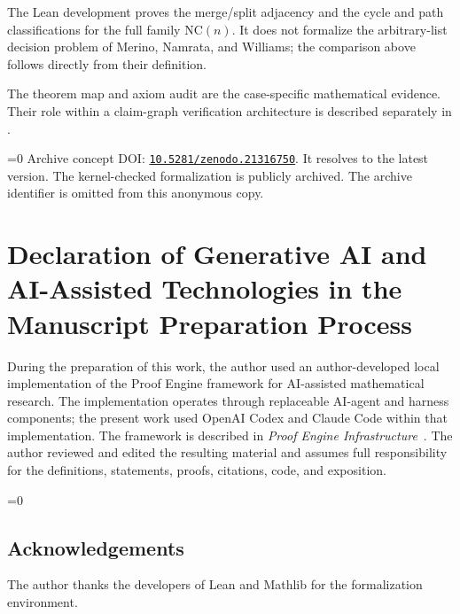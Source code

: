 \documentclass[12pt]{article}
\newcommand{\blindmode}{0}
\newcommand{\blindmode}{1}
\newcommand{\NC}{\mathrm{NC}}
\begin{document}
The Lean development proves the merge/split adjacency and the cycle and path
classifications for the full family $\NC(n)$.  It does not formalize the
arbitrary-list decision problem of Merino, Namrata, and Williams; the
comparison above follows directly from their definition.

\ifdefined\ssrnrevisiononly
\else
The theorem map and axiom audit are the case-specific mathematical evidence.
Their role within a claim-graph verification architecture is described
separately in \cite{LiProofEngine}.
\fi

\ifnum\blindmode=0
Archive concept DOI:
\href{https://doi.org/10.5281/zenodo.21316750}{\nolinkurl{10.5281/zenodo.21316750}}.
It resolves to the latest version.
\else
The kernel-checked formalization is publicly archived.  The archive identifier
is omitted from this anonymous copy.
\fi

\section*{Declaration of Generative AI and AI-Assisted Technologies in the Manuscript Preparation Process}

During the preparation of this work, the author used an author-developed local
implementation of the Proof Engine framework for AI-assisted mathematical
research.  The implementation operates through replaceable AI-agent and
harness components; the present work used OpenAI Codex and Claude Code within
that implementation.  The framework is described in \emph{Proof Engine
Infrastructure}~\cite{LiProofEngine}.  The author reviewed and edited the
resulting material and assumes full responsibility for the definitions,
statements, proofs, citations, code, and exposition.

\ifnum\blindmode=0
\subsection*{Acknowledgements}
The author thanks the developers of Lean and Mathlib for the formalization
environment.
\fi
\end{document}
